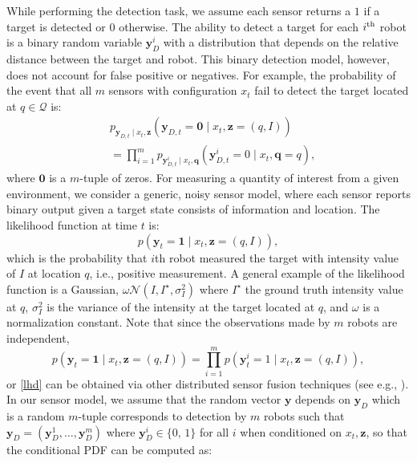 \documentclass[letterpaper, 10 pt, conference]{ieeeconf}
\begin{document}
While performing the detection task, we assume each sensor returns a $1$ if a target is detected or $0$ otherwise. 
The ability to detect a target for each $i^{\textup{th}}$ robot is a binary random variable $\bm{y}_D^i$ with a distribution that depends on the relative distance between the target and robot. 
This binary detection model, however, does not account for false positive or negatives.
For example, the probability of the event that all $m$ sensors with configuration $x_t$ fail to detect the target located at $q \in \mathcal{Q}$ is:
\begin{align}
&p_{\bm{y}_{D,t} \mid
	{x}_{t},\bm{z}}\left(
\bm{y}_{D,t} = \bm{0} \mid {x}_{t},
\bm{z}=(q,I)\right) \nonumber \\
&= \prod_{i =1 }^{m}
p_{\bm{y}_{D,t}^i \mid
	{x}_{t},\bm{q}}\left(
\bm{y}_{D,t}^i = 0 \mid
{x}_{t},\bm{q}=q\right), \nonumber
\end{align}
where $\bm{0}$ is a $m$-tuple of zeros. For measuring a quantity of interest from a given environment, we consider a generic, noisy sensor model, where each sensor reports
binary output given a target state consists of information and location.
The likelihood function at time $t$ is:
\begin{equation}
p(\bm{y}_t = \bm{1} \mid x_t, \bm{z} = (q,I)),
\label{lhd}
\end{equation}
which is the probability that $i$th robot measured the target 
with intensity value of $I$ at location $q$, i.e., positive measurement.
A general example of the likelihood function is a Gaussian, $\omega\mathcal{N}(I,I^{\star},\sigma_I^2)$ where $I^{\star}$ the ground truth intensity value at $q$, $\sigma_I^2$ is the variance of the intensity at the target located at $q$, and $\omega$ is a normalization constant. Note that since the observations made by $m$ robots are independent,
\[
p(\bm{y}_t = \bm{1} \mid x_t, \bm{z} = (q,I)) =
\prod_{i=1}^m
p(\bm{y}_t^i = 1 \mid x_t, \bm{z} = (q,I)),
\] 
or \eqref{lhd} can be obtained via other distributed sensor fusion techniques (see e.g., \cite{stroupe2001distributed}).
In our sensor model, we assume that the random vector $\bm{y}$ depends on $\bm{y}_D$ which is a random $m$-tuple corresponds to detection by $m$ robots such that $\bm{y}_D = (\bm{y}_D^1,\dots,\bm{y}_D^m)$ where $\bm{y}_D^i \in \lbrace 0,\,1 \rbrace$ for all $i$ when conditioned on $x_t,\bm{z}$, so that the conditional PDF can be computed as:
\end{document}

